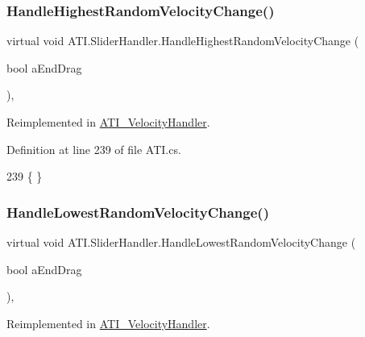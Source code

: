 \subsubsection{\texorpdfstring{Handle\+Highest\+Random\+Velocity\+Change()}{HandleHighestRandomVelocityChange()}}
{\footnotesize\ttfamily virtual void A\+T\+I.\+Slider\+Handler.\+Handle\+Highest\+Random\+Velocity\+Change (\begin{DoxyParamCaption}\item[{bool}]{a\+End\+Drag }\end{DoxyParamCaption})\hspace{0.3cm}{\ttfamily [protected]}, {\ttfamily [virtual]}}



Reimplemented in \hyperlink{class_a_t_i___velocity_handler_a6e1fd3ceb35873a09e138bebd0c323fd}{A\+T\+I\+\_\+\+Velocity\+Handler}.



Definition at line 239 of file A\+T\+I.\+cs.


\begin{DoxyCode}
239 \{ \}
\end{DoxyCode}
\mbox{\label{class_a_t_i_1_1_slider_handler_a710b59b6e8bf059af76477a930572d9e}} 
\subsubsection{\texorpdfstring{Handle\+Lowest\+Random\+Velocity\+Change()}{HandleLowestRandomVelocityChange()}}
{\footnotesize\ttfamily virtual void A\+T\+I.\+Slider\+Handler.\+Handle\+Lowest\+Random\+Velocity\+Change (\begin{DoxyParamCaption}\item[{bool}]{a\+End\+Drag }\end{DoxyParamCaption})\hspace{0.3cm}{\ttfamily [protected]}, {\ttfamily [virtual]}}



Reimplemented in \hyperlink{class_a_t_i___velocity_handler_a17b6e0de9e45dfb9dba1ea4f2c0a122c}{A\+T\+I\+\_\+\+Velocity\+Handler}.



